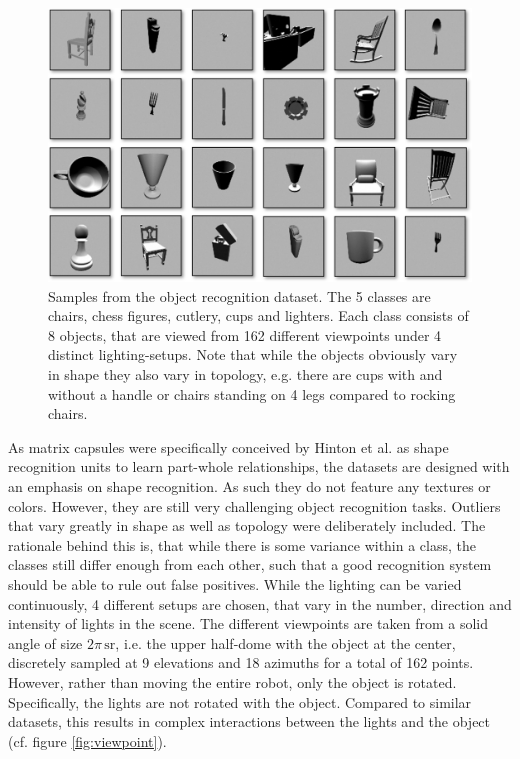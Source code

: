 \begin{figure}[H]
    \centering
    \includegraphics[width=\textwidth]{figures/dataset.png}
\caption[Samples from the object recognition dataset.]{Samples from the object recognition dataset. The 5 classes are chairs, chess figures, cutlery, cups and lighters. Each class consists of 8 objects, that are viewed from 162 different viewpoints under 4 distinct lighting-setups. Note that while the objects obviously vary in shape they also vary in topology,  e.g. there are cups with and without a handle or chairs standing on 4 legs compared to rocking chairs.}\label{fig:dataset}
\end{figure}\noindent
As matrix capsules were specifically conceived by Hinton et al. as shape recognition units to learn part-whole relationships, the datasets are designed with an emphasis on shape recognition. As such they do not feature any textures or colors. However, they are still very challenging object recognition tasks. Outliers that vary greatly in shape as well as topology were deliberately included. The rationale behind this is, that while there is some variance within a class, the classes still differ enough from each other, such that a good recognition system should be able to rule out false positives. While the lighting can be varied continuously, 4 different setups are chosen, that vary in the number, direction and intensity of lights in the scene. The different viewpoints are taken from a solid angle of size $2\pi\,\si{\steradian}$, i.e. the upper half-dome with the object at the center, discretely sampled at 9 elevations and 18 azimuths for a total of 162 points. However, rather than moving the entire robot, only the object is rotated. Specifically, the lights are not rotated with the object. Compared to similar datasets, this results in complex interactions between the lights and the object (cf. figure \ref{fig:viewpoint}).
